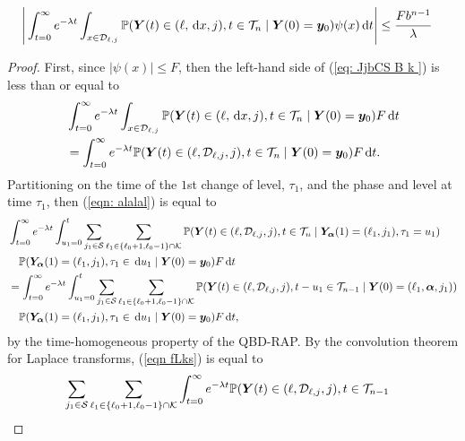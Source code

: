 \begin{cor}\label{vcor: cdks d}
	\begin{align}
		\Bigg|&\int_{t=0}^\infty e^{-\lambda t}\int_{x\in\mathcal{D}_{\ell,j}}\mathbb P({\boldsymbol Y}(t) \in (\ell,\, \mathrm{d} x, j), t\in\mathcal T_n \mid 
		\boldsymbol Y(0)=\boldsymbol y_0)
		\psi(x) \, \mathrm{d} t \Bigg|
		\leq \cfrac{F b^{n-1}}{\lambda}\label{eq: JjbCS  B k }
	\end{align}
\end{cor}
\begin{proof}
	First, since \(|\psi(x)|\leq F\), then the left-hand side of (\ref{eq: JjbCS  B k }) is less than or equal to 
	\begin{align}
		&\int_{t=0}^\infty e^{-\lambda t}\int_{x\in\mathcal{D}_{\ell,j}}\mathbb P({\boldsymbol Y}(t) \in (\ell,\, \mathrm{d} x,j), t\in\mathcal T_n \mid  \nonumber 
		\boldsymbol Y(0)=\boldsymbol y_0)F\, \mathrm{d} t \nonumber
		\\&=\int_{t=0}^\infty e^{-\lambda t} \mathbb P( {\boldsymbol Y}(t) \in (\ell,\mathcal D_{\ell,j},j), t\in\mathcal T_n \mid \boldsymbol Y(0)=\boldsymbol y_0)F\, \mathrm{d} t. \label{eqn: alalal}
	\end{align}
	Partitioning on the time of the \(1\)st change of level, \(\tau_1\), and the phase and level at time \(\tau_1\), then (\ref{eqn: alalal}) is equal to 
	\begin{align}
		&\int_{t=0}^\infty e^{-\lambda t} \int_{u_1=0}^t \sum_{j_1\in\mathcal S}\sum_{\ell_1\in\{\ell_0+1,\ell_0-1\}\cap\mathcal K}\mathbb P( {\boldsymbol Y}(t) \in (\ell,\mathcal D_{\ell,j},j), t\in\mathcal T_n \nonumber
		\mid \bm{Y}_{\bm{\alpha}}(1)=(\ell_1,j_1),  \tau_1=u_1)\nonumber
		\\&\quad\mathbb P(\bm{Y}_{\bm{\alpha}}(1)=(\ell_1,j_1), \tau_1\in \, \mathrm{d} u_1
		\mid \boldsymbol Y(0)=\boldsymbol y_0)F  \, \mathrm{d} t\nonumber
		\\&=\int_{t=0}^\infty e^{-\lambda t} \int_{u_1=0}^t \sum_{j_1\in\mathcal S}\sum_{\ell_1\in\{\ell_0+1,\ell_0-1\}\cap\mathcal K}\mathbb P( {\boldsymbol Y}(t) \in (\ell,\mathcal D_{\ell,j},j), t-u_1\in\mathcal T_{n-1} \nonumber
		\mid \boldsymbol Y(0)=(\ell_1,\boldsymbol \alpha,j_1))\nonumber
		\\&\quad\mathbb P(\bm{Y}_{\bm{\alpha}}(1)=(\ell_1,j_1), \tau_1\in \, \mathrm{d} u_1
		\mid \boldsymbol Y(0)=\boldsymbol y_0)F  \, \mathrm{d} t, \label{eqn fLks}
	\end{align}
	by the time-homogeneous property of the QBD-RAP. By the convolution theorem for Laplace transforms, (\ref{eqn fLks}) is equal to 
	\begin{align}
		&\sum_{j_1\in\mathcal S}\sum_{\ell_1\in\{\ell_0+1,\ell_0-1\}\cap\mathcal K} \int_{t=0}^\infty e^{-\lambda t} \mathbb P({\bs Y}(t) \in (\ell,\mathcal D_{\ell,j},j), t\in\mathcal T_{n-1} \nonumber

\end{align}
\end{proof}
